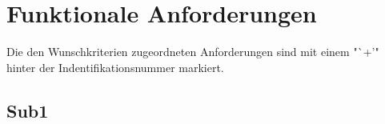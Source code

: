 \section{Funktionale Anforderungen}

Die den Wunschkriterien zugeordneten Anforderungen sind mit einem "`+'" hinter der Indentifikationsnummer markiert.

\subsection{Sub1}

%
